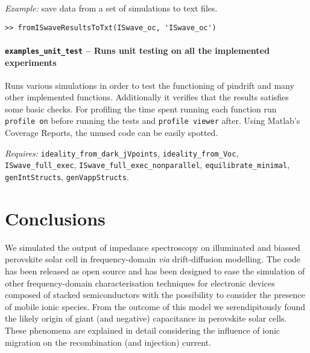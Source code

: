 
	\textit{Example:} save data from a set of simulations to text files.
	\begin{lstlisting}[style=Matlab-editor]
>> fromISwaveResultsToTxt(ISwave_oc, 'ISwave_oc')
\end{lstlisting}


		\paragraph{\texttt{examples\_unit\_test} -- Runs unit testing on all the implemented experiments}
Runs various simulations in order to test the functioning of pindrift and many other implemented functions.
Additionally it verifies that the results satisfies some basic checks.
For profiling the time spent running each function run \texttt{profile\- on} before running the tests and \texttt{profile\- viewer} after.
Using Matlab's Coverage Reports, the unused code can be easily spotted.

\textit{Requires:} \texttt{ideality\_from\_dark\_jVpoints}, \texttt{ideality\_from\_Voc}, \texttt{IS\-wave\_full\_exec}, \texttt{IS\-wave\_full\_exec\_nonparallel}, \texttt{equilibrate\_minimal}, \texttt{gen\-Int\-Structs}, \texttt{gen\-Vapp\-Structs}.


\section{Conclusions}
We simulated the output of impedance spectroscopy on illuminated and biassed perovskite solar cell in frequency\hyp{}domain \textsl{via} drift\hyp{}diffusion modelling.
The code has been released as open source and has been designed to ease the simulation of other frequency\hyp{}domain characterisation techniques for electronic devices composed of stacked semiconductors with the possibility to consider the presence of mobile ionic species.
From the outcome of this model we serendipitously found the likely origin of giant (and negative) capacitance in perovskite solar cells.
These phenomena are explained in detail considering the influence of ionic migration on the recombination (and injection) current.

